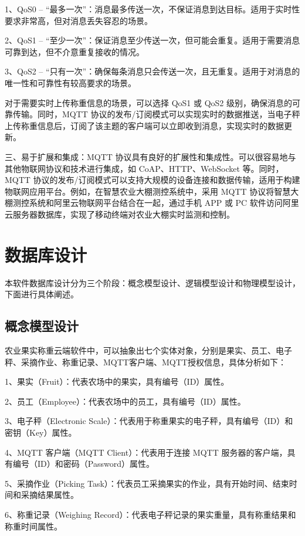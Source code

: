 1、QoS0 – “最多一次”：消息最多传送一次，不保证消息到达目标。适用于实时性要求非常高，但对消息丢失容忍的场景。

2、QoS1 – “至少一次”：保证消息至少传送一次，但可能会重复。适用于需要消息可靠到达，但不介意重复接收的情况。

3、QoS2 – “只有一次”：确保每条消息只会传送一次，且无重复。适用于对消息的唯一性和可靠性有较高要求的场景。

对于需要实时上传称重信息的场景，可以选择 QoS1 或 QoS2 级别，确保消息的可靠传输。同时，MQTT 协议的发布/订阅模式可以实现实时的数据推送，当电子秤上传称重信息后，订阅了该主题的客户端可以立即收到消息，实现实时的数据更新。

三、易于扩展和集成：MQTT 协议具有良好的扩展性和集成性。可以很容易地与其他物联网协议和技术进行集成，如 CoAP、HTTP、WebSocket 等。同时，MQTT 协议的发布/订阅模式可以支持大规模的设备连接和数据传输，适用于构建物联网应用平台。例如，在智慧农业大棚测控系统中，采用 MQTT 协议将智慧大棚测控系统和阿里云物联网平台结合在一起，通过手机 APP 或 PC 软件访问阿里云服务器数据库，实现了移动终端对农业大棚实时监测和控制\cite{Liang2020}。

\section{数据库设计}

本软件数据库设计分为三个阶段：概念模型设计、逻辑模型设计和物理模型设计，下面进行具体阐述。

\subsection{概念模型设计}

农业果实称重云端软件中，可以抽象出七个实体对象，分别是果实、员工、电子秤、采摘作业、称重记录、MQTT客户端、MQTT授权信息，具体分析如下：

1、果实（Fruit）：代表农场中的果实，具有编号（ID）属性。

2、员工（Employee）：代表农场中的员工，具有编号（ID）属性。

3、电子秤（Electronic Scale）：代表用于称重果实的电子秤，具有编号（ID）和密钥（Key）属性。

4、MQTT 客户端（MQTT Client）：代表用于连接 MQTT 服务器的客户端，具有编号（ID）和密码（Password）属性。

5、采摘作业（Picking Task）：代表员工采摘果实的作业，具有开始时间、结束时间和采摘结果属性。

6、称重记录（Weighing Record）：代表电子秤记录的果实重量，具有称重结果和称重时间属性。

